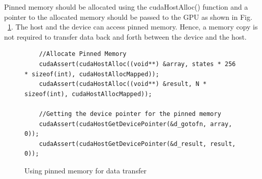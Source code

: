 Pinned memory should be allocated using the cudaHostAlloc() function and a pointer to the allocated memory should be passed to the GPU as shown in Fig. ~\ref{fig:pinnedmemory}. The host and the device can access pinned memory. Hence, a memory copy is not required to transfer data back and forth between the device and the host.

\begin{figure}[H]
	\begin{lstlisting}
	//Allocate Pinned Memory
	cudaAssert(cudaHostAlloc((void**) &array, states * 256 * sizeof(int), cudaHostAllocMapped));
	cudaAssert(cudaHostAlloc((void**) &result, N * sizeof(int), cudaHostAllocMapped));
	
	//Getting the device pointer for the pinned memory
	cudaAssert(cudaHostGetDevicePointer(&d_gotofn, array, 0));
	cudaAssert(cudaHostGetDevicePointer(&d_result, result, 0));
	\end{lstlisting}
	\caption{Using pinned memory for data transfer}
	\label{fig:pinnedmemory}
\end{figure}
\squeezeup
